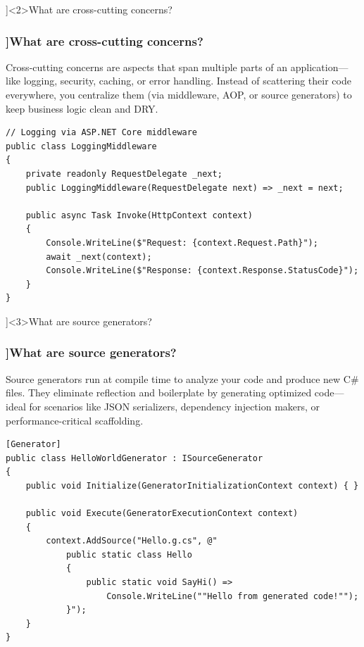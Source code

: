 \QuestionSlide[\CategoryBadge[ArchColor!20]{Architecture}]<2>{What are cross-cutting concerns?}
\begin{frame}[fragile]
  \frametitle{\AnswerTitle[\CategoryBadge[ArchColor!20]{Architecture}]{What are cross-cutting concerns?}}

  {\footnotesize
    Cross-cutting concerns are aspects that span multiple parts of an application—like logging, security, caching, or error handling. Instead of scattering their code everywhere, you centralize them (via middleware, AOP, or source generators) to keep business logic clean and DRY.
  }

  \begin{verbatim}
// Logging via ASP.NET Core middleware
public class LoggingMiddleware
{
    private readonly RequestDelegate _next;
    public LoggingMiddleware(RequestDelegate next) => _next = next;

    public async Task Invoke(HttpContext context)
    {
        Console.WriteLine($"Request: {context.Request.Path}");
        await _next(context);
        Console.WriteLine($"Response: {context.Response.StatusCode}");
    }
}
  \end{verbatim}
\end{frame}

\QuestionSlide[\CategoryBadge[MetaColor!20]{Metaprogramming}]<3>{What are source generators?}
\begin{frame}[fragile]
  \frametitle{\AnswerTitle[\CategoryBadge[MetaColor!20]{Metaprogramming}]{What are source generators?}}

  {\footnotesize
    Source generators run at compile time to analyze your code and produce new C\# files. They eliminate reflection and boilerplate by generating optimized code—ideal for scenarios like JSON serializers, dependency injection makers, or performance-critical scaffolding.
  }

  \begin{verbatim}
[Generator]
public class HelloWorldGenerator : ISourceGenerator
{
    public void Initialize(GeneratorInitializationContext context) { }

    public void Execute(GeneratorExecutionContext context)
    {
        context.AddSource("Hello.g.cs", @"
            public static class Hello
            {
                public static void SayHi() =>
                    Console.WriteLine(""Hello from generated code!"");
            }");
    }
}
  \end{verbatim}
\end{frame}

